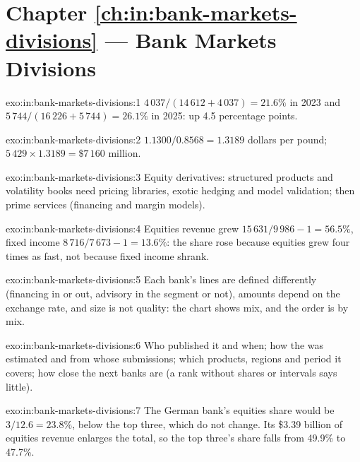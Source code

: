 \section*{Chapter \ref{ch:in:bank-markets-divisions} --- Bank Markets Divisions}

\begin{solution}{exo:in:bank-markets-divisions:1}
$4\,037/(14\,612+4\,037)=21.6\%$ in 2023 and $5\,744/(16\,226+5\,744)=26.1\%$ in 2025: up 4.5 percentage points.
\end{solution}

\begin{solution}{exo:in:bank-markets-divisions:2}
$1.1300/0.8568=1.3189$ dollars per pound; $5\,429\times1.3189=\$7\,160$ million.
\end{solution}

\begin{solution}{exo:in:bank-markets-divisions:3}
Equity derivatives: structured products and volatility books need pricing libraries, exotic hedging and model
validation; then prime services (financing and margin models).
\end{solution}

\begin{solution}{exo:in:bank-markets-divisions:4}
Equities revenue grew $15\,631/9\,986-1=56.5\%$, fixed income $8\,716/7\,673-1=13.6\%$: the share rose because equities
grew four times as fast, not because fixed income shrank.
\end{solution}

\begin{solution}{exo:in:bank-markets-divisions:5}
Each bank's lines are defined differently (financing in or out, advisory in the segment or not), amounts depend on the
exchange rate, and size is not quality: the chart shows mix, and the order is by mix.
\end{solution}

\begin{solution}{exo:in:bank-markets-divisions:6}
Who published it and when; how the  was estimated and from whose submissions; which products, regions and
period it covers; how close the next banks are (a rank without shares or intervals says little).
\end{solution}

\begin{solution}{exo:in:bank-markets-divisions:7}
The German bank's equities share would be $3/12.6=23.8\%$, below the top three, which do not change. Its \$3.39 billion
of equities revenue enlarges the total, so the top three's share falls from 49.9\% to 47.7\%.
\end{solution}

